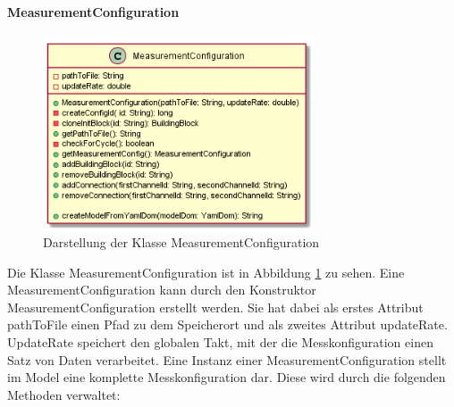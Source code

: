 \documentclass[parskip=full]{scrartcl}
\begin{document}
\paragraph{MeasurementConfiguration}
\begin{figure}[htbp]
	\begin{center}
		\includegraphics[width = 8cm]{Grafiken/MeasurementConfiguration.png}
		\caption{Darstellung der Klasse MeasurementConfiguration}
		\label{MeasurementConfiguration}
	\end{center}
\end{figure}
Die Klasse MeasurementConfiguration ist in Abbildung \ref{MeasurementConfiguration} zu sehen. Eine MeasurementConfiguration kann durch den Konstruktor MeasurementConfiguration erstellt werden. Sie hat dabei als erstes Attribut pathToFile einen Pfad zu dem Speicherort und als zweites Attribut updateRate. UpdateRate speichert den globalen Takt, mit der die Messkonfiguration einen Satz von Daten verarbeitet. Eine Instanz einer MeasurementConfiguration stellt im Model eine komplette Messkonfiguration dar. Diese wird durch die folgenden Methoden verwaltet:
\end{document}
